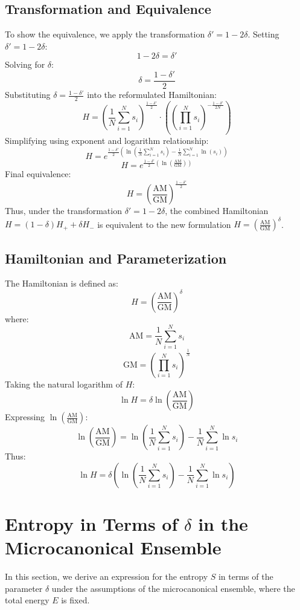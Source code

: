 \documentclass{article}
\begin{document}
\subsection{Transformation and Equivalence}

To show the equivalence, we apply the transformation \(\delta' = 1 - 2\delta\). Setting \(\delta' = 1 - 2\delta\):
\[
1 - 2\delta = \delta'
\]
Solving for \(\delta\):
\[
\delta = \frac{1 - \delta'}{2}
\]
Substituting \(\delta = \frac{1 - \delta'}{2}\) into the reformulated Hamiltonian:
\[
H = \left( \frac{1}{N} \sum_{i=1}^N s_i \right)^{\frac{1 - \delta'}{2}} \cdot \left( \left( \prod_{i=1}^N s_i \right)^{-\frac{1 - \delta'}{2N}} \right)
\]
Simplifying using exponent and logarithm relationship:
\[
H = e^{\frac{1 - \delta'}{2} \left( \ln\left( \frac{1}{N} \sum_{i=1}^N s_i \right) - \frac{1}{N} \sum_{i=1}^N \ln(s_i) \right)}
\]
\[
H = e^{\frac{1 - \delta'}{2} \left( \ln\left( \frac{\text{AM}}{\text{GM}} \right) \right)}
\]
Final equivalence:
\[
H = \left( \frac{\text{AM}}{\text{GM}} \right)^{\frac{1 - \delta'}{2}}
\]
Thus, under the transformation \(\delta' = 1 - 2\delta\), the combined Hamiltonian \( H = (1 - \delta) H_+ + \delta H_- \) is equivalent to the new formulation \( H = \left( \frac{\text{AM}}{\text{GM}} \right)^\delta \).


\subsection{Hamiltonian and Parameterization}

The Hamiltonian is defined as:
\[
H = \left( \frac{\text{AM}}{\text{GM}} \right)^\delta
\]
where:
\[
\text{AM} = \frac{1}{N} \sum_{i=1}^N s_i
\]
\[
\text{GM} = \left( \prod_{i=1}^N s_i \right)^{\frac{1}{N}}
\]
Taking the natural logarithm of \(H\):
\[
\ln H = \delta \ln \left( \frac{\text{AM}}{\text{GM}} \right)
\]
Expressing \(\ln \left( \frac{\text{AM}}{\text{GM}} \right)\):
\[
\ln \left( \frac{\text{AM}}{\text{GM}} \right) = \ln \left( \frac{1}{N} \sum_{i=1}^N s_i \right) - \frac{1}{N} \sum_{i=1}^N \ln s_i
\]
Thus:
\[
\ln H = \delta \left( \ln \left( \frac{1}{N} \sum_{i=1}^N s_i \right) - \frac{1}{N} \sum_{i=1}^N \ln s_i \right)
\]

\section{Entropy in Terms of \(\delta\) in the Microcanonical Ensemble}

In this section, we derive an expression for the entropy \(S\) in terms of the parameter \(\delta\) under the assumptions of the microcanonical ensemble, where the total energy \(E\) is fixed.
\end{document}
